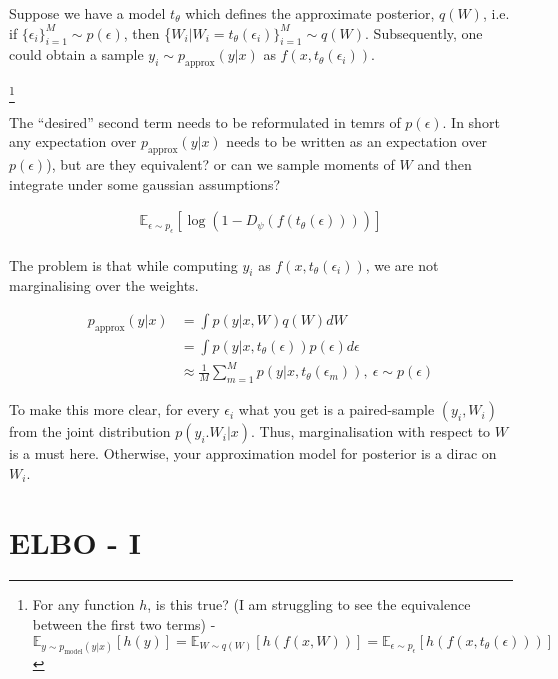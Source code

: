 \documentclass[twoside]{article}
\begin{document}
Suppose we have a model $t_\theta$ which defines the approximate posterior, $q(W)$, i.e. if $\{\epsilon_i\}_{i=1}^M \sim p(\epsilon)$, then \{$W_i | W_i = t_\theta(\epsilon_i)\}_{i=1}^M\sim q(W)$. Subsequently, one could obtain a sample $y_i \sim p_{\text{approx}}(y|x)$ as $f(x,t_\theta(\epsilon_i))$.


\footnote{For any function $h$, is this true? (I am struggling to see the equivalence between the first two terms) - $\mathbb{E}_{y\sim p_{\text{model}}(y|x)}[h(y)] = \mathbb{E}_{W\sim q(W)}[h(f(x,W))] = \mathbb{E}_{\epsilon\sim p_{\epsilon}}[h(f(x,t_\theta(\epsilon)))]$}


The ``desired'' second term needs to be reformulated in temrs of $p(\epsilon)$. In short any expectation over $p_{\text{approx}}(y|x)$ needs to be written as an expectation over $p(\epsilon)$), but are they equivalent? or can we sample moments of $W$ and then integrate under some gaussian assumptions?

\begin{align}
\mathbb{E}_{\epsilon\sim p_{\epsilon}}[\log \left( 1-D_\psi(f(t_\theta(\epsilon))) \right) ]\\
\end{align}


The problem is that while computing $y_i$ as $f(x,t_\theta(\epsilon_i))$, we are not marginalising over the weights. 

\begin{align}
p_{\text{approx}}(y|x) &= \int p(y|x,W)q(W) dW\\
& = \int p(y|x,t_\theta(\epsilon))p(\epsilon)d\epsilon\\
&\approx \frac{1}{M} \sum_{m=1}^{M} p(y|x,t_\theta(\epsilon_m)), \ \epsilon \sim p(\epsilon)
\end{align}

To make this more clear, for every $\epsilon_i$ what you get is a paired-sample $(y_i,W_i)$ from the joint distribution $p(y_i.W_i|x)$. Thus, marginalisation with respect to $W$ is a must here. Otherwise, your approximation model for posterior is a dirac on $W_i$.


\section{ELBO - I}
\end{document}
